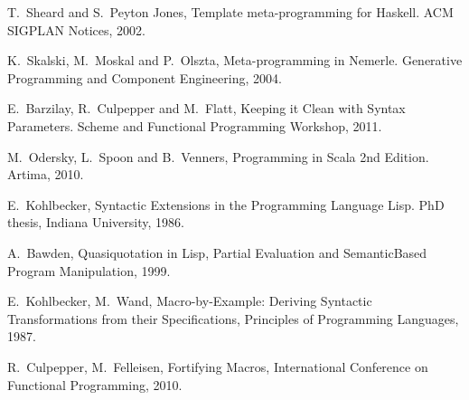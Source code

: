 \documentclass[10pt,journal,a4paper]{IEEEtran}
\begin{document}
\begin{thebibliography}{1}

T.~Sheard and S.~Peyton Jones,
Template meta-programming for Haskell.
ACM SIGPLAN Notices, 2002.

K.~Skalski, M.~Moskal and P.~Olszta,
Meta-programming in Nemerle.
Generative Programming and Component Engineering, 2004.

E.~Barzilay, R.~Culpepper and M.~Flatt,
Keeping it Clean with Syntax Parameters.
Scheme and Functional Programming Workshop, 2011.

M.~Odersky, L.~Spoon and B.~Venners,
Programming in Scala 2nd Edition.
Artima, 2010.

E.~Kohlbecker,
Syntactic Extensions in the Programming Language Lisp.
PhD thesis, Indiana University, 1986.

A.~Bawden,
Quasiquotation in Lisp,
Partial Evaluation and SemanticBased Program Manipulation, 1999.

E.~Kohlbecker, M.~Wand,
Macro-by-Example: Deriving Syntactic Transformations from their Specifications,
Principles of Programming Languages, 1987.

R.~Culpepper, M.~Felleisen,
Fortifying Macros,
International Conference on Functional Programming, 2010.

\end{thebibliography}
\end{document}
